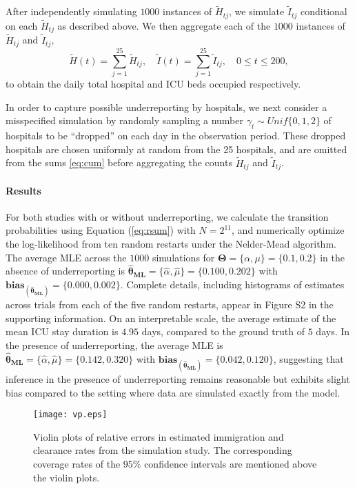 \documentclass{article}
\begin{document}
After independently simulating $1000$ instances of $\tilde{H}_{tj}$,  we simulate $\tilde{I}_{tj}$ conditional on each $\tilde{H}_{tj}$ as described above. We then aggregate each of the $1000$ instances of $\tilde{H}_{tj}$ and $\tilde{I}_{tj}$, 
\begin{equation}\label{eq:cum}
    \tilde{H}(t) = \sum_{j=1}^{25} \tilde{H}_{tj}, \quad \tilde{I}(t)=\sum_{j=1}^{25} \tilde{I}_{tj}, \quad 0 \leq t \leq 200,
\end{equation} to obtain the  daily total hospital and ICU beds occupied respectively. \par

In order to capture possible underreporting by hospitals, we next consider a misspecified simulation by randomly sampling a number $\gamma_{t} \sim Unif\{0,1,2\}$ of hospitals to be ``dropped'' on each day in the observation period. These dropped hospitals are chosen uniformly at random from the 25 hospitals, and are omitted from the sums \eqref{eq:cum} before aggregating the counts $\tilde{H}_{tj}$ and $\tilde{I}_{tj}$. \par

\paragraph{Results} 
For both studies with or without underreporting, we calculate the transition probabilities using Equation (\ref{eq:rsum}) with $N=2^{11}$, and numerically optimize the log-likelihood from ten random restarts under the Nelder-Mead algorithm. The average MLE across the $1000$ simulations for $\mathbf{\Theta} = \{\alpha, \mu\} = \{0.1, 0.2\}$ in the absence of underreporting is $\pmb{\hat{\theta}_{ML}} = \{\hat{\alpha}, \hat{\mu}\} = \{0.100, 0.202\}$ with $\pmb{bias}_{(\pmb{\hat{\theta}_{ML}})} = \{0.000, 0.002\}$. Complete details, including histograms of estimates across trials from each of the five random restarts, appear in Figure S2 in the supporting information. On an interpretable scale, the average estimate of the mean ICU stay duration is $4.95$ days, compared to the ground truth of $5$ days. In the presence of underreporting, the average MLE is $\pmb{\hat{\theta}_{ML}} = \{\hat{\alpha}, \hat{\mu}\} = \{0.142, 0.320\}$ with $\pmb{bias}_{(\pmb{\hat{\theta}_{ML}})} = \{0.042 , 0.120\}$, suggesting that inference in the presence of underreporting remains reasonable but exhibits slight bias compared to the setting where data are simulated exactly from the model. 

\begin{figure}[h]
\centering
\texttt{[image: vp.eps]}
\caption{Violin plots of relative errors in estimated immigration and clearance rates from the simulation study. The corresponding coverage rates of the $95\%$ confidence intervals are mentioned above the violin plots.}
\label{fig3}
\end{figure}
\end{document}
